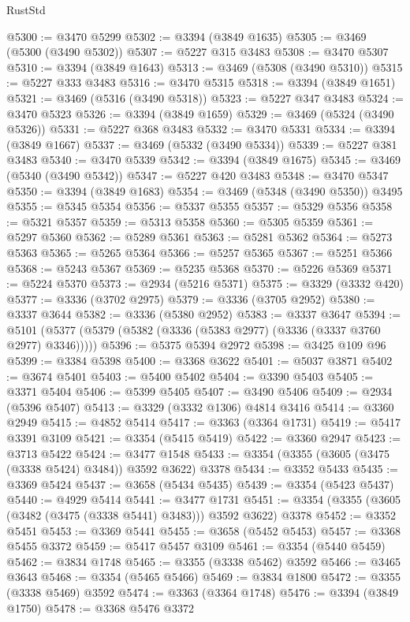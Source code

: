 \begin{lexlean}{RustStd}
\begin{coremodule}
@5300 := @3470 @5299
@5302 := @3394 (@3849 @1635)
@5305 := @3469 (@5300 (@3490 @5302))
@5307 := @5227 @315 @3483
@5308 := @3470 @5307
@5310 := @3394 (@3849 @1643)
@5313 := @3469 (@5308 (@3490 @5310))
@5315 := @5227 @333 @3483
@5316 := @3470 @5315
@5318 := @3394 (@3849 @1651)
@5321 := @3469 (@5316 (@3490 @5318))
@5323 := @5227 @347 @3483
@5324 := @3470 @5323
@5326 := @3394 (@3849 @1659)
@5329 := @3469 (@5324 (@3490 @5326))
@5331 := @5227 @368 @3483
@5332 := @3470 @5331
@5334 := @3394 (@3849 @1667)
@5337 := @3469 (@5332 (@3490 @5334))
@5339 := @5227 @381 @3483
@5340 := @3470 @5339
@5342 := @3394 (@3849 @1675)
@5345 := @3469 (@5340 (@3490 @5342))
@5347 := @5227 @420 @3483
@5348 := @3470 @5347
@5350 := @3394 (@3849 @1683)
@5354 := @3469 (@5348 (@3490 @5350)) @3495
@5355 := @5345 @5354
@5356 := @5337 @5355
@5357 := @5329 @5356
@5358 := @5321 @5357
@5359 := @5313 @5358
@5360 := @5305 @5359
@5361 := @5297 @5360
@5362 := @5289 @5361
@5363 := @5281 @5362
@5364 := @5273 @5363
@5365 := @5265 @5364
@5366 := @5257 @5365
@5367 := @5251 @5366
@5368 := @5243 @5367
@5369 := @5235 @5368
@5370 := @5226 @5369
@5371 := @5224 @5370
@5373 := @2934 (@5216 @5371)
@5375 := @3329 (@3332 @420)
@5377 := @3336 (@3702 @2975)
@5379 := @3336 (@3705 @2952)
@5380 := @3337 @3644
@5382 := @3336 (@5380 @2952)
@5383 := @3337 @3647
@5394 := @5101 (@5377 (@5379 (@5382 (@3336 (@5383 @2977) (@3336 (@3337 @3760 @2977) @3346)))))
@5396 := @5375 @5394 @2972
@5398 := @3425 @109 @96
@5399 := @3384 @5398
@5400 := @3368 @3622
@5401 := @5037 @3871
@5402 := @3674 @5401
@5403 := @5400 @5402
@5404 := @3390 @5403
@5405 := @3371 @5404
@5406 := @5399 @5405
@5407 := @3490 @5406
@5409 := @2934 (@5396 @5407)
@5413 := @3329 (@3332 @1306) @4814 @3416
@5414 := @3360 @2949
@5415 := @4852 @5414
@5417 := @3363 (@3364 @1731)
@5419 := @5417 @3391 @3109
@5421 := @3354 (@5415 @5419)
@5422 := @3360 @2947
@5423 := @3713 @5422
@5424 := @3477 @1548
@5433 := @3354 (@3355 (@3605 (@3475 (@3338 @5424) @3484)) @3592 @3622) @3378
@5434 := @3352 @5433
@5435 := @3369 @5424
@5437 := @3658 (@5434 @5435)
@5439 := @3354 (@5423 @5437)
@5440 := @4929 @5414
@5441 := @3477 @1731
@5451 := @3354 (@3355 (@3605 (@3482 (@3475 (@3338 @5441) @3483))) @3592 @3622) @3378
@5452 := @3352 @5451
@5453 := @3369 @5441
@5455 := @3658 (@5452 @5453)
@5457 := @3368 @5455 @3372
@5459 := @5417 @5457 @3109
@5461 := @3354 (@5440 @5459)
@5462 := @3834 @1748
@5465 := @3355 (@3338 @5462) @3592
@5466 := @3465 @3643
@5468 := @3354 (@5465 @5466)
@5469 := @3834 @1800
@5472 := @3355 (@3338 @5469) @3592
@5474 := @3363 (@3364 @1748)
@5476 := @3394 (@3849 @1750)
@5478 := @3368 @5476 @3372

\end{coremodule}
\end{lexlean}
